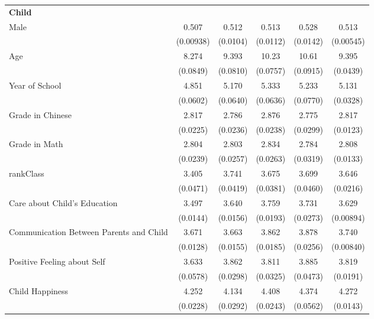 \documentclass[12pt]{extarticle}
\begin{document}
\begin{table}
\begin{threeparttable}
\begin{tabular}{l*{5}{c}}
\textbf{Child} \\
Male                &       0.507&       0.512&       0.513&       0.528&       0.513\\
                    &   (0.00938)&    (0.0104)&    (0.0112)&    (0.0142)&   (0.00545)\\
[1em]
Age                 &       8.274&       9.393&       10.23&       10.61&       9.395\\
                    &    (0.0849)&    (0.0810)&    (0.0757)&    (0.0915)&    (0.0439)\\
[1em]
Year of School      &       4.851&       5.170&       5.333&       5.233&       5.131\\
                    &    (0.0602)&    (0.0640)&    (0.0636)&    (0.0770)&    (0.0328)\\
[1em]
Grade in Chinese    &       2.817&       2.786&       2.876&       2.775&       2.817\\
                    &    (0.0225)&    (0.0236)&    (0.0238)&    (0.0299)&    (0.0123)\\
[1em]
Grade in Math       &       2.804&       2.803&       2.834&       2.784&       2.808\\
                    &    (0.0239)&    (0.0257)&    (0.0263)&    (0.0319)&    (0.0133)\\
[1em]
rankClass           &       3.405&       3.741&       3.675&       3.699&       3.646\\
                    &    (0.0471)&    (0.0419)&    (0.0381)&    (0.0460)&    (0.0216)\\
[1em]
Care about Child's Education&       3.497&       3.640&       3.759&       3.731&       3.629\\
                    &    (0.0144)&    (0.0156)&    (0.0193)&    (0.0273)&   (0.00894)\\
[1em]
Communication Between Parents and Child&       3.671&       3.663&       3.862&       3.878&       3.740\\
                    &    (0.0128)&    (0.0155)&    (0.0185)&    (0.0256)&   (0.00840)\\
[1em]
Positive Feeling about Self&       3.633&       3.862&       3.811&       3.885&       3.819\\
                    &    (0.0578)&    (0.0298)&    (0.0325)&    (0.0473)&    (0.0191)\\
[1em]
Child Happiness     &       4.252&       4.134&       4.408&       4.374&       4.272\\
                    &    (0.0228)&    (0.0292)&    (0.0243)&    (0.0562)&    (0.0143)\\

\end{tabular}
\end{threeparttable}
\end{table}
\end{document}

